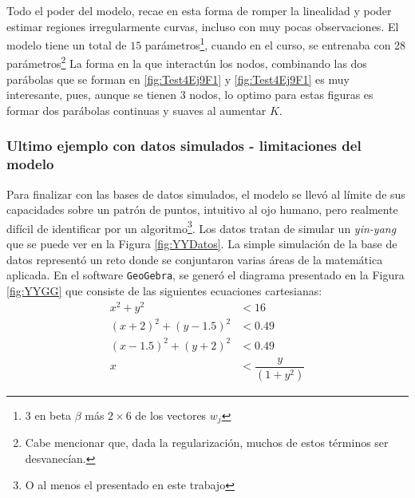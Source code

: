 \documentclass[../Main/Main.tex]{subfiles}
\begin{document}
Todo el poder del modelo, recae en esta forma de romper la linealidad y poder estimar regiones irregularmente curvas, incluso con muy pocas observaciones. El modelo tiene un total de $15$ parámetros\footnote{3 en beta $\beta$ más $2\times6$ de los vectores $w_j$}, cuando en el curso, se entrenaba con 28 parámetros\footnote{Cabe mencionar que, dada la regularización, muchos de estos términos ser desvanecían.} La forma en la que interactún los nodos, combinando las dos parábolas que se forman en \ref{fig:Test4Ej9F1} y \ref{fig:Test4Ej9F1} es muy interesante, pues, aunque se tienen 3 nodos, lo optimo para estas figuras es formar dos parábolas continuas y suaves al aumentar $K$. 

\subsubsection*{Ultimo ejemplo con datos simulados - limitaciones del modelo}
Para finalizar con las  bases de datos simulados, el modelo se llevó al límite de sus capacidades sobre un patrón de puntos, intuitivo al ojo humano, pero realmente difícil de identificar por un algoritmo\footnote{O al menos el presentado en este trabajo}. Los datos tratan de simular un \textit{yin-yang} que se puede ver en la Figura \ref{fig:YYDatos}. La simple simulación de la base de datos representó un reto donde se conjuntaron varias áreas de la matemática aplicada. En el software \verb|GeoGebra|, se generó el diagrama presentado en la Figura \ref{fig:YYGG} que consiste de las siguientes ecuaciones cartesianas:
\begin{align*}
	x^2 + y^2 &< 16 \\
	(x+2)^2 + (y-1.5)^2 &< 0.49 \\
	(x-1.5)^2 + (y+2)^2 &< 0.49 \\[4pt]
	x &< \dfrac{y}{(1+y^2)}
\end{align*}
\end{document}
